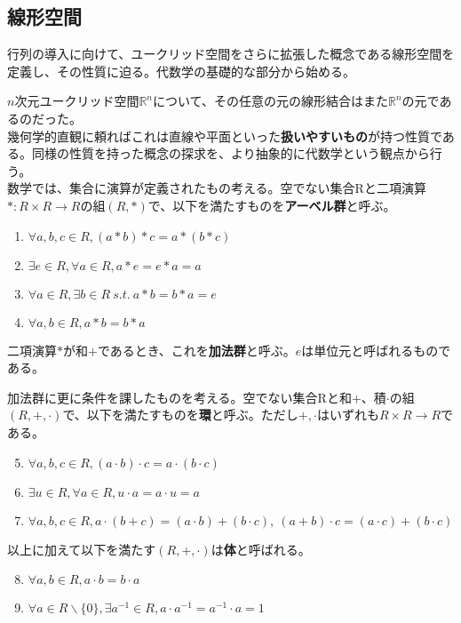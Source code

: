\documentclass[dvipdfmx]{jsarticle}
\begin{document}
\subsection{線形空間}
行列の導入に向けて、ユークリッド空間をさらに拡張した概念である線形空間を定義し、その性質に迫る。代数学の基礎的な部分から始める。\\\par
\motiv $n$次元ユークリッド空間$\mathbb{R}^n$について、その任意の元の線形結合はまた$\mathbb{R}^n$の元であるのだった。\\
幾何学的直観に頼ればこれは直線や平面といった\textbf{扱いやすいもの}が持つ性質である。同様の性質を持った概念の探求を、より抽象的に代数学という観点から行う。\\
\build 数学では、集合に演算が定義されたもの考える。空でない集合Rと二項演算$\ast:R \times R \rightarrow R$の組$(R,\ast)$で、以下を満たすものを\textbf{アーベル群}と呼ぶ。
\begin{enumerate}
\item $\forall a,b,c \in R, (a \ast b) \ast c = a \ast (b \ast c)$
\item $\exists e \in R, \forall a \in R, a \ast e = e \ast a = a$
\item $\forall a \in R, \exists b \in R~s.t.~a \ast b = b \ast a = e$
\item $\forall a,b \in R, a \ast b = b \ast a$
\end{enumerate}
二項演算$\ast$が和$+$であるとき、これを\textbf{加法群}と呼ぶ。$e$は単位元と呼ばれるものである。\par
加法群に更に条件を課したものを考える。空でない集合Rと和$+$、積$\cdot$の組$(R,+,\cdot)$で、以下を満たすものを\textbf{環}と呼ぶ。ただし$+,\cdot$はいずれも$R \times R \rightarrow R$である。
\begin{enumerate}
\setcounter{enumi}{4}
\item $\forall a,b,c \in R, (a \cdot b) \cdot c = a \cdot (b \cdot c)$
\item $\exists u \in R, \forall a \in R, u \cdot a = a \cdot u = a$
\item $\forall a,b,c \in R, a \cdot (b + c) = (a \cdot b) + (b \cdot c),~(a + b) \cdot c = (a \cdot c) + (b \cdot c)$
\end{enumerate}\par
以上に加えて以下を満たす$(R,+,\cdot)$は\textbf{体}と呼ばれる。
\begin{enumerate}
\setcounter{enumi}{7}
\item $\forall a,b \in R,a \cdot b = b \cdot a$
\item $\forall a \in R \backslash \{0\}, \exists a^{-1} \in R, a \cdot a^{-1} = a^{-1} \cdot a = 1$
\end{enumerate}
\end{document}
